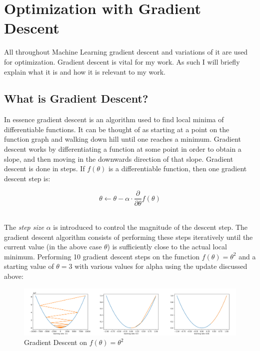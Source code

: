 \section{Optimization with Gradient Descent}\label{gd}
All throughout Machine Learning gradient descent and variations of it are used for optimization. Gradient descent is vital for my work. As such I will briefly explain what it is and how it is relevant to my work.

\subsection{What is Gradient Descent?}\label{gd:what_is_it}
In essence gradient descent is an algorithm used to find local minima of differentiable functions. It can be thought of as starting at a point on the function graph and walking down hill until one reaches a minimum. Gradient descent works by differentiating a function at some point in order to obtain a slope, and then moving in the downwards direction of that slope. Gradient descent is done in steps. If $f(\theta)$ is a differentiable function, then one gradient descent step is:

\begin{equation}\label{Graident_Descent:basic_update}
    \theta \leftarrow \theta - \alpha \cdot \frac{\partial}{\partial \theta}f(\theta)
\end{equation}

\noindent
\\ The \textit{step size} $\alpha$ is introduced to control the magnitude of the descent step. The gradient descent algorithm consists of performing these steps iteratively until the current value (in the above case $\theta$) is sufficiently close to the actual local minimum. Performing 10 gradient descent steps on the function $f(\theta) = \theta^2$ and a starting value of $\theta = 3$ with various values for alpha using the update discussed above:

\begin{figure}[ht]
    \centering
    \includegraphics[width=\linewidth]{figures/grad_desc.png}
    \caption{Gradient Descent on $f(\theta) = \theta^2$}
    \label{fig:UNO}
\end{figure}

